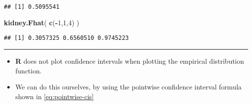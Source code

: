 \documentclass[]{book}
\newenvironment{Shaded}{\begin{snugshade}}{\end{snugshade}}
\newcommand{\DecValTok}[1]{\textcolor[rgb]{0.00,0.00,0.81}{#1}}
\newcommand{\KeywordTok}[1]{\textcolor[rgb]{0.13,0.29,0.53}{\textbf{#1}}}
\newcommand{\NormalTok}[1]{#1}
\newcommand{\OperatorTok}[1]{\textcolor[rgb]{0.81,0.36,0.00}{\textbf{#1}}}
\begin{document}
\begin{verbatim}
## [1] 0.5095541
\end{verbatim}

\begin{Shaded}
\begin{Highlighting}[]
\KeywordTok{kidney.Fhat}\NormalTok{( }\KeywordTok{c}\NormalTok{(}\OperatorTok{-}\DecValTok{1}\NormalTok{,}\DecValTok{1}\NormalTok{,}\DecValTok{4}\NormalTok{) )}
\end{Highlighting}
\end{Shaded}

\begin{verbatim}
## [1] 0.3057325 0.6560510 0.9745223
\end{verbatim}

\begin{center}\rule{0.5\linewidth}{\linethickness}\end{center}

\begin{itemize}
\item
  \textbf{R} does not plot confidence intervals when plotting the empirical distribution function.
\item
  We can do this ourselves, by using the pointwise confidence interval formula shown in \eqref{eq:pointwise-cis}
\end{itemize}
\end{document}
